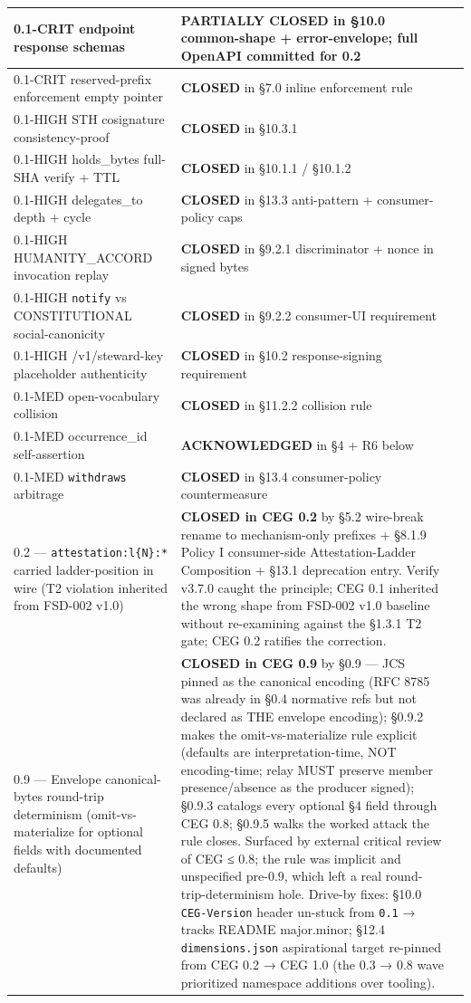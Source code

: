 \documentclass[11pt]{article}
\begin{document}
{\begin{longtable}{|p{5.33cm}|p{5.33cm}|p{5.33cm}|}
0.1-CRIT endpoint response schemas & \textbf{PARTIALLY CLOSED} in §10.0 common-shape + error-envelope; full OpenAPI committed for 0.2 &  \\ \hline
0.1-CRIT reserved-prefix enforcement empty pointer & \textbf{CLOSED} in §7.0 inline enforcement rule &  \\ \hline
0.1-HIGH STH cosignature consistency-proof & \textbf{CLOSED} in §10.3.1 &  \\ \hline
0.1-HIGH holds\_bytes full-SHA verify + TTL & \textbf{CLOSED} in §10.1.1 / §10.1.2 &  \\ \hline
0.1-HIGH delegates\_to depth + cycle & \textbf{CLOSED} in §13.3 anti-pattern + consumer-policy caps &  \\ \hline
0.1-HIGH HUMANITY\_ACCORD invocation replay & \textbf{CLOSED} in §9.2.1 discriminator + nonce in signed bytes &  \\ \hline
0.1-HIGH \texttt{notify} vs CONSTITUTIONAL social-canonicity & \textbf{CLOSED} in §9.2.2 consumer-UI requirement &  \\ \hline
0.1-HIGH /v1/steward-key placeholder authenticity & \textbf{CLOSED} in §10.2 response-signing requirement &  \\ \hline
0.1-MED open-vocabulary collision & \textbf{CLOSED} in §11.2.2 collision rule &  \\ \hline
0.1-MED occurrence\_id self-assertion & \textbf{ACKNOWLEDGED} in §4 + R6 below &  \\ \hline
0.1-MED \texttt{withdraws} arbitrage & \textbf{CLOSED} in §13.4 consumer-policy countermeasure &  \\ \hline
0.2 — \texttt{attestation:l\{N\}:*} carried ladder-position in wire (T2 violation inherited from FSD-002 v1.0) & \textbf{CLOSED in CEG 0.2} by §5.2 wire-break rename to mechanism-only prefixes + §8.1.9 Policy I consumer-side Attestation-Ladder Composition + §13.1 deprecation entry. Verify v3.7.0 caught the principle; CEG 0.1 inherited the wrong shape from FSD-002 v1.0 baseline without re-examining against the §1.3.1 T2 gate; CEG 0.2 ratifies the correction. &  \\ \hline
0.9 — Envelope canonical-bytes round-trip determinism (omit-vs-materialize for optional fields with documented defaults) & \textbf{CLOSED in CEG 0.9} by §0.9 — JCS pinned as the canonical encoding (RFC 8785 was already in §0.4 normative refs but not declared as THE envelope encoding); §0.9.2 makes the omit-vs-materialize rule explicit (defaults are interpretation-time, NOT encoding-time; relay MUST preserve member presence/absence as the producer signed); §0.9.3 catalogs every optional §4 field through CEG 0.8; §0.9.5 walks the worked attack the rule closes. Surfaced by external critical review of CEG ≤ 0.8; the rule was implicit and unspecified pre-0.9, which left a real round-trip-determinism hole. Drive-by fixes: §10.0 \texttt{CEG-Version} header un-stuck from \texttt{0.1} → tracks README major.minor; §12.4 \texttt{dimensions.json} aspirational target re-pinned from CEG 0.2 → CEG 1.0 (the 0.3 → 0.8 wave prioritized namespace additions over tooling). &  \\ \hline

\end{longtable}}
\end{document}
